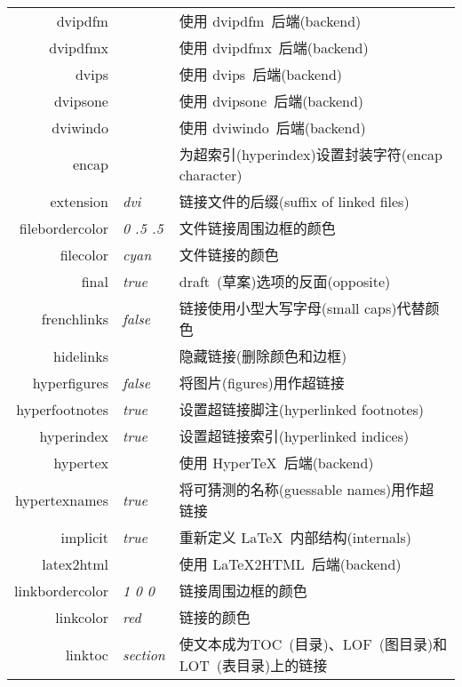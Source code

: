 \documentclass{article}
\begin{document}
\begin{longtable}{@{}>{\ttfamily}rlp{7cm}@{}}
dvipdfm            &                        & 使用 \textsf{dvipdfm}\ 后端(backend)\\
dvipdfmx           &                        & 使用 \textsf{dvipdfmx}\ 后端(backend)\\
dvips              &                        & 使用 \textsf{dvips}\ 后端(backend)\\
dvipsone           &                        & 使用 \textsf{dvipsone}\ 后端(backend)\\
dviwindo           &                        & 使用 \textsf{dviwindo}\ 后端(backend)\\
encap              &                        & 为超索引(hyperindex)设置封装字符(encap character)\\
extension          & \textit{dvi}           & 链接文件的后缀(suffix of linked files) \\
filebordercolor    & \textit{0 .5 .5}       & 文件链接周围边框的颜色 \\
filecolor          & \textit{cyan}          & 文件链接的颜色 \\
final              & \textit{true}          & draft~(草案)选项的反面(opposite) \\
frenchlinks        & \textit{false}         & 链接使用小型大写字母(small caps)代替颜色\\
hidelinks          &                        & 隐藏链接(删除颜色和边框) \\
hyperfigures       & \textit{false}         & 将图片(figures)用作超链接\\
hyperfootnotes     & \textit{true}          & 设置超链接脚注(hyperlinked footnotes) \\
hyperindex         & \textit{true}          & 设置超链接索引(hyperlinked indices) \\
hypertex           &                        & 使用 \textsf{Hyper\TeX}\ 后端(backend) \\
hypertexnames      & \textit{true}          & 将可猜测的名称(guessable names)用作超链接\\
implicit           & \textit{true}          & 重新定义 \LaTeX\ 内部结构(internals)\\
latex2html         &                        & 使用 \textsf{\LaTeX2HTML}\ 后端(backend) \\
linkbordercolor    & \textit{1 0 0}         & 链接周围边框的颜色 \\
linkcolor          & \textit{red}           & 链接的颜色 \\
linktoc            & \textit{section}       & 使文本成为TOC~(目录)、LOF~(图目录)和LOT~(表目录)上的链接\\

\end{longtable}
\end{document}

